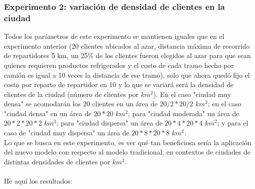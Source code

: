 \documentclass{article}
\begin{document}
\subsubsection{Experimento 2: variación de densidad de clientes en la ciudad}

Todos los parámetros de este experimento se mantienen iguales que en el experimento anterior (20 clientes ubicados al azar, distancia máxima de recorrido de repartidores 5 km, un 25\% de los clientes fueron elegidos al azar para que sean quienes requieren productos refrigerados y el costo de cada tramo hecho por camión es igual a 10 veces la distancia de ese tramo), solo que ahora quedó fijo el costo por reparto de repartidor en 10 y lo que se variará será la densidad de clientes de la ciudad (número de clientes por $km^{2}$). En el caso "ciudad muy densa" se acomodarán los 20 clientes en un área de  $20/2 * 20/2$ $km^{2}$; en el caso "ciudad densa" en un área de $20 * 20$ $km^{2}$; para "ciudad moderada" un área de $20*2 * 20*2$ $km^{2}$; para "ciudad dispersa" un área de $20*4 * 20*4$ $km^{2}$; y para el caso de "ciudad muy dispersa" un área de $20*8 * 20*8$ $km^{2}$.  \\
Lo que se busca en este experimento, es ver qué tan beneficiosa sería la aplicación del nuevo modelo con respecto al modelo tradicional, en contextos de ciudades de distintas densidades de clientes por $km^{2}$. \\
\\
He aquí los resultados:

\begin{table}[H]
\centering
{}
\caption{Comparación de costos entre metodologías para distintas densidades de clientes por $km^{2}$}
\end{table}
\end{document}
